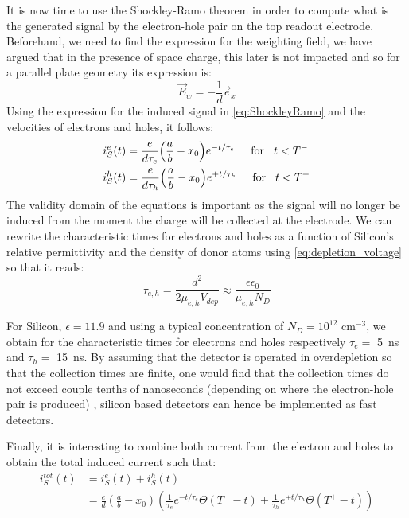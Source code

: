 		It is now time to use the Shockley-Ramo theorem in order to compute what is the generated signal by the electron-hole pair on the top readout electrode. Beforehand, we need to find the expression for the weighting field, we have argued that in the presence of space charge, this later is not impacted and so for a parallel plate geometry its expression is: 
		\begin{equation}
			\vec{E}_w = - \frac{1}{d} \vec{e}_x
			\label{eq:weighting_field}
		\end{equation}
		Using the expression for the induced signal in \eqref{eq:ShockleyRamo} and the velocities of electrons and holes, it follows: 
		\begin{equation}
			\begin{split}
				i_S^e(t) &= \frac{e}{d\tau_e}{\left( \frac{a}{b} - x_0 \right)} e^{-t/\tau_e} \hspace{5mm} \text{for} \hspace{3mm} t < T^- \\
				i_S^h(t) &= \frac{e}{d\tau_h}{\left( \frac{a}{b} - x_0 \right)} e^{+t/\tau_h} \hspace{5mm} \text{for} \hspace{3mm} t < T^+
			\end{split}
		\end{equation}
		The validity domain of the equations is important as the signal will no longer be induced from the moment the charge will be collected at the electrode. We can rewrite the characteristic times for electrons and holes as a function of Silicon's relative permittivity and the density of donor atoms using \eqref{eq:depletion_voltage} so that it reads: 
		\begin{equation}
			\tau_{e,h} = \frac{d^2}{2 \mu_{e,h}V_{dep}} \approx \frac{\epsilon \epsilon_0}{\mu_{e,h} N_D}
		\end{equation}

		For Silicon, $\epsilon = 11.9$ and using a typical concentration of $N_D = 10^{12}$ cm$^{-3}$, we obtain for the characteristic times for electrons and holes respectively $\tau_e =$ \SI{5}{\nano\second} and $\tau_h =$ \SI{15}{\nano\second}. By assuming that the detector is operated in overdepletion so that the collection times are finite, one would find that the collection times do not exceed couple tenths of nanoseconds (depending on where the electron-hole pair is produced) \cite{detectors}, silicon based detectors can hence be implemented as fast detectors. 

		Finally, it is interesting to combine both current from the electron and holes to obtain the total induced current such that: 
		\begin{equation}
			\begin{split}
				i_S^{tot}(t) 	&= i_S^{e}(t) + i_S^{h}(t) \\
											&=\frac{e}{d} {\left( \frac{a}{b} -x_0\right)} {\left( \frac{1}{\tau_e}e^{-t/\tau_e}\Theta(T^- - t) + \frac{1}{\tau_h}e^{+t/\tau_h}\Theta(T^+ - t) \right)}
			\end{split}
		\end{equation}

